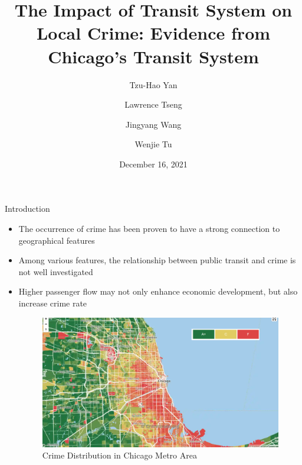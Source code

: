 \documentclass{beamer}
\title[UST]{The Impact of Transit System on Local Crime: Evidence from Chicago’s Transit System} %
\author{\small Tzu-Hao Yan \and Lawrence Tseng \and Jingyang Wang \and Wenjie Tu}  %
\institute[ETH] %
{
ETH \& UZH \\ %
\medskip
}
\date{December 16, 2021} %
\begin{document}
\begin{frame}
\titlepage %
\end{frame}




\begin{frame}{Introduction}
\begin{itemize}
\item The occurrence of crime has been proven to have a strong connection to geographical features
\item Among various features, the relationship between public transit and crime is not well investigated
\item Higher passenger flow may not only enhance economic development, but also increase crime rate
\hfill
\hfill
\begin{figure}
    
    \includegraphics[scale=0.2]{figures/Crime_rate.png}
    \caption{Crime Distribution in Chicago Metro Area}
    \label{fig:Crime_rate.png}
\end{figure}
\end{itemize}
\end{frame}


\end{document}
